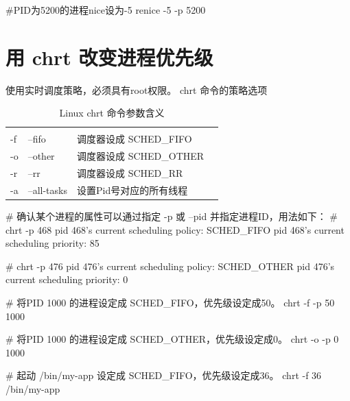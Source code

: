 \begin{latexcmd}[label=nice命令改变进程优先级]
#PID为5200的进程nice设为-5
renice -5 -p 5200
\end{latexcmd}
\begin{tcolorbox}[colback=blue!5,colframe=blue!75!black,title=renice设置进程视频]
\end{tcolorbox}

\section{用 chrt 改变进程优先级}
使用实时调度策略，必须具有root权限。
chrt 命令的策略选项
\begin{table}[!htbp]
\stabbox{3.0cm}
{\caption{Linux chrt 命令参数含义}\label{}}
{\begin{tabular*}{\cflwidth}{@{\hspace{5pt}}@{\extracolsep{\fill}}*{4}{@{\hspace{-3pt}}l}}
     &   &               \\
    -f & --fifo   &  调度器设成 SCHED\_FIFO              \\
    -o & --other  &   调度器设成 SCHED\_OTHER            \\
    -r & --rr     &   调度器设成 SCHED\_RR           \\
    -a & --all-tasks &  设置Pid号对应的所有线程              \\
\end{tabular*}
\floatfoot*{}
}
\end{table}

\begin{latexcmd}[label=chrt使用方法]
# 确认某个进程的属性可以通过指定 -p 或 --pid 并指定进程ID，用法如下：
# chrt -p 468
pid 468's current scheduling policy: SCHED_FIFO
pid 468's current scheduling priority: 85

# chrt -p 476
pid 476's current scheduling policy: SCHED_OTHER
pid 476's current scheduling priority: 0

# 将PID 1000 的进程设定成 SCHED_FIFO，优先级设定成50。
chrt -f -p 50 1000

# 将PID 1000 的进程设定成 SCHED_OTHER，优先级设定成0。
chrt -o -p 0 1000

# 起动 /bin/my-app 设定成 SCHED_FIFO，优先级设定成36。
chrt -f 36 /bin/my-app
\end{latexcmd}
\begin{tcolorbox}[colback=blue!5,colframe=blue!75!black,title=chrt设置进程视频]
\end{tcolorbox}


